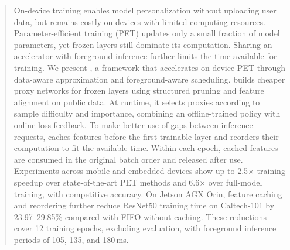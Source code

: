 \begin{abstract}
\begingroup
\color{blue}
On-device training enables model personalization without uploading user data, but remains costly on devices with limited computing resources.
Parameter-efficient training (PET) updates only a small fraction of model parameters, yet frozen layers still dominate its computation.
Sharing an accelerator with foreground inference further limits the time available for training.
We present \sys, a framework that accelerates on-device PET through data-aware approximation and foreground-aware scheduling.
\sys builds cheaper proxy networks for frozen layers using structured pruning and feature alignment on public data.
At runtime, it selects proxies according to sample difficulty and importance, combining an offline-trained policy with online loss feedback.
To make better use of gaps between inference requests, \sys caches features before the first trainable layer and reorders their computation to fit the available time.
Within each epoch, cached features are consumed in the original batch order and released after use.
Experiments across mobile and embedded devices show up to 2.5$\times$ training speedup over state-of-the-art PET methods and 6.6$\times$ over full-model training, with competitive accuracy.
On Jetson AGX Orin, feature caching and reordering further reduce ResNet50 training time on Caltech-101 by 23.97--29.85\% compared with FIFO without caching.
These reductions cover 12 training epochs, excluding evaluation, with foreground inference periods of 105, 135, and 180\,ms.
\par
\endgroup
\end{abstract}
